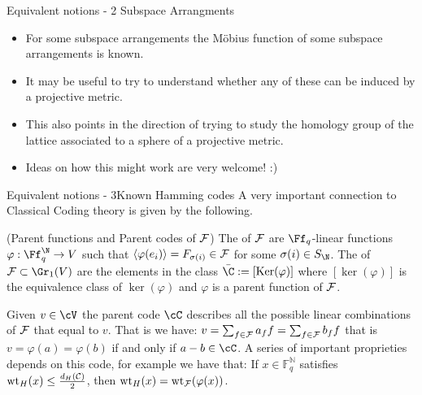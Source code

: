 \begin{frame}{Equivalent notions - 2 }{Subspace Arrangments}
\begin{itemize}
	\item For some subspace arrangements the  Möbius function of some subspace arrangements is known.
	\item It may be useful to try to understand whether any of these can be induced by a projective metric. 
	\item This also points in the direction of trying to study the homology group of the lattice associated to a sphere of a projective metric.
	\item Ideas on how this might work are very welcome! :)
\end{itemize}
\end{frame}

\begin{frame}{Equivalent notions - 3}{Known Hamming codes}
	A very important connection to Classical Coding theory is given by the following.
	\begin{definition}(Parent functions and Parent codes of $\operatorname{\mathcal{F}}$)
		The  of $\operatorname{\mathcal{F}}$ are $\Ff_q$-linear functions $\varphi: \Ff_q^{\N} \to V$ such that $\langle \varphi( e_i ) \rangle = F_{\sigma(i)} \in \operatorname{\mathcal{F}}$ for some $\sigma(i) \in S_{\N}$.
		The  of $\cF\subset \Gr_1(V)$ are the elements in the class $\bar \C := [\ker (\varphi)]$ where \([\ker (\varphi)]\) is the equivalence class of $\ker(\varphi)$ and \(\varphi\) is a parent function of $\operatorname{\mathcal{F}}$.
	\end{definition}

Given \(v \in \cV\) the parent code \(\cC\) describes all the possible linear combinations of \(\operatorname{\mathcal{F}}\) that equal to \(v\).
That is we have: \(v = \sum_{f \in \operatorname{\mathcal{F}}} a_ff = \sum_{f \in \operatorname{\mathcal{F}}} b_ff \) that is \(v = \varphi(a) = \varphi(b)\) if and only if \( a-b \in \cC\). 
A series of important proprieties depends on this code, for example we have that:
If \(x \in \mathbb{F}_q^\mathbb{N}\) satisfies \(\operatorname{wt}_H(x) \leq \frac{d_H(\mathcal{C})}{2}\), then \(\operatorname{wt}_H(x) = \operatorname{wt}_\mathcal{F}(\varphi(x))\).


\end{frame}


